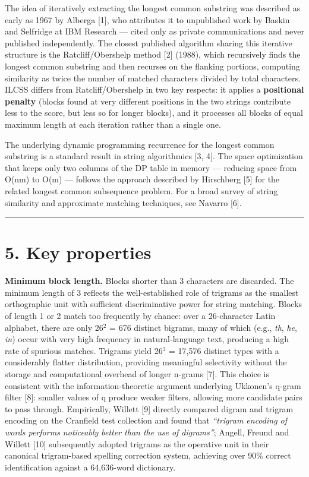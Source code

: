 \documentclass[
  11pt,
]{article}
\begin{document}
The idea of iteratively extracting the longest common substring was
described as early as 1967 by Alberga {[}1{]}, who attributes it to
unpublished work by Baskin and Selfridge at IBM Research --- cited only
as private communications and never published independently. The closest
published algorithm sharing this iterative structure is the
Ratcliff/Obershelp method {[}2{]} (1988), which recursively finds the
longest common substring and then recurses on the flanking portions,
computing similarity as twice the number of matched characters divided
by total characters. ILCSS differs from Ratcliff/Obershelp in two key
respects: it applies a \textbf{positional penalty} (blocks found at very
different positions in the two strings contribute less to the score, but
less so for longer blocks), and it processes all blocks of equal maximum
length at each iteration rather than a single one.

The underlying dynamic programming recurrence for the longest common
substring is a standard result in string algorithmics {[}3, 4{]}. The
space optimization that keeps only two columns of the DP table in memory
--- reducing space from O(nm) to O(m) --- follows the approach described
by Hirschberg {[}5{]} for the related longest common subsequence
problem. For a broad survey of string similarity and approximate
matching techniques, see Navarro {[}6{]}.

\begin{center}\rule{0.5\linewidth}{0.5pt}\end{center}

\section{5. Key properties}\label{key-properties}

\textbf{Minimum block length.} Blocks shorter than 3 characters are
discarded. The minimum length of 3 reflects the well-established role of
trigrams as the smallest orthographic unit with sufficient
discriminative power for string matching. Blocks of length 1 or 2 match
too frequently by chance: over a 26-character Latin alphabet, there are
only 26$^2$ = 676 distinct bigrams, many of which (e.g., \emph{th},
\emph{he}, \emph{in}) occur with very high frequency in natural-language
text, producing a high rate of spurious matches. Trigrams yield 26$^3$ =
17,576 distinct types with a considerably flatter distribution,
providing meaningful selectivity without the storage and computational
overhead of longer n-grams {[}7{]}. This choice is consistent with the
information-theoretic argument underlying Ukkonen's q-gram filter
{[}8{]}: smaller values of q produce weaker filters, allowing more
candidate pairs to pass through. Empirically, Willett {[}9{]} directly
compared digram and trigram encoding on the Cranfield test collection
and found that \emph{``trigram encoding of words performs noticeably
better than the use of digrams''}; Angell, Freund and Willett {[}10{]}
subsequently adopted trigrams as the operative unit in their canonical
trigram-based spelling correction system, achieving over 90\% correct
identification against a 64,636-word dictionary.
\end{document}
